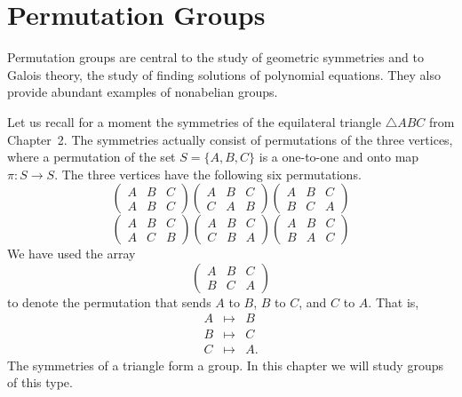 \chapter{Permutation Groups}\label{permute}
 
 
 
Permutation groups are central to the study of geometric symmetries
and to Galois theory, the study of finding solutions of polynomial
equations.  They also provide abundant examples of nonabelian groups. 
 
 
Let us recall for a moment  the symmetries of the equilateral triangle 
$\bigtriangleup ABC$ from Chapter~2. The symmetries actually consist
of permutations of the three vertices, where a {\bfi
permutation} of the set $S = \{ A, B, 
C \}$ is a one-to-one and onto map $\pi :S \rightarrow S$. The three
vertices have the following six permutations.  
$$
\left(
\begin{array}{ccc}
A & B & C \\
A & B & C
\end{array}
\right)
\left(
\begin{array}{ccc}
A & B & C \\
C & A & B
\end{array}
\right)
\left(
\begin{array}{ccc}
A & B & C \\
B & C & A
\end{array}
\right)
$$
$$
\left(
\begin{array}{ccc}
A & B & C \\
A & C & B
\end{array}
\right)
\left(
\begin{array}{ccc}
A & B & C \\
C & B & A
\end{array}
\right)
\left(
\begin{array}{ccc}
A & B & C \\
B & A & C
\end{array}
\right)
$$
We have used the array
$$
\left(
\begin{array}{ccc}
A & B & C \\
B & C & A
\end{array}
\right)
$$
to  denote the permutation  that sends $A$ to $B$, $B$ to $C$, and $C$
to $A$. That is, 
\begin{eqnarray*}
A & \mapsto & B \\
B & \mapsto & C \\
C & \mapsto & A.
\end{eqnarray*}
The symmetries of a triangle form a group. In this chapter we will
study groups of this type.  
 
